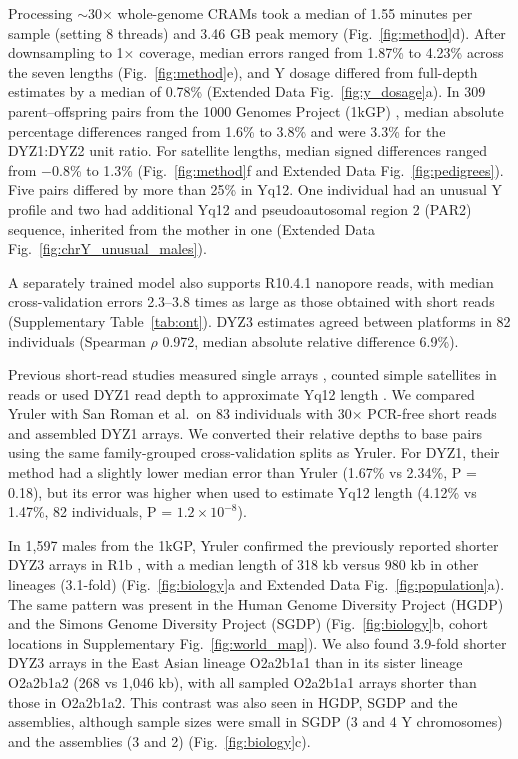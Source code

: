 Processing $\sim$30$\times$ whole-genome CRAMs took a median of 1.55 minutes per sample (setting 8 threads) and 3.46 GB peak memory (Fig.~\ref{fig:method}d). After downsampling to 1$\times$ coverage, median errors ranged from 1.87\% to 4.23\% across the seven lengths (Fig.~\ref{fig:method}e), and Y dosage differed from full-depth estimates by a median of 0.78\% (Extended Data Fig.~\ref{fig:y_dosage}a). In 309 parent--offspring pairs from the 1000 Genomes Project (1kGP) \cite{ByrskaBishop2022}, median absolute percentage differences ranged from 1.6\% to 3.8\% and were 3.3\% for the DYZ1:DYZ2 unit ratio. For satellite lengths, median signed differences ranged from $-$0.8\% to 1.3\% (Fig.~\ref{fig:method}f and Extended Data Fig.~\ref{fig:pedigrees}). Five pairs differed by more than 25\% in Yq12. One individual had an unusual Y profile and two had additional Yq12 and pseudoautosomal region 2 (PAR2) sequence, inherited from the mother in one (Extended Data Fig.~\ref{fig:chrY_unusual_males}).

A separately trained model also supports R10.4.1 nanopore reads, with median cross-validation errors 2.3--3.8 times as large as those obtained with short reads (Supplementary Table~\ref{tab:ont}). DYZ3 estimates agreed between platforms in 82 individuals (Spearman $\rho$ 0.972, median absolute relative difference 6.9\%).

Previous short-read studies measured single arrays \cite{Miga2014,Altemose2014}, counted simple satellites in reads \cite{Said2024} or used DYZ1 read depth to approximate Yq12 length \cite{SanRoman2024}. We compared Yruler with San Roman et al.\ on 83 individuals with 30$\times$ PCR-free short reads and assembled DYZ1 arrays. We converted their relative depths to base pairs using the same family-grouped cross-validation splits as Yruler. For DYZ1, their method had a slightly lower median error than Yruler (1.67\% vs 2.34\%, P = 0.18), but its error was higher when used to estimate Yq12 length (4.12\% vs 1.47\%, 82 individuals, P = $1.2\times10^{-8}$).

In 1,597 males from the 1kGP, Yruler confirmed the previously reported shorter DYZ3 arrays in R1b \cite{Hallast2023}, with a median length of 318 kb versus 980 kb in other lineages (3.1-fold) (Fig.~\ref{fig:biology}a and Extended Data Fig.~\ref{fig:population}a). The same pattern was present in the Human Genome Diversity Project (HGDP) \cite{Bergstrom2020} and the Simons Genome Diversity Project (SGDP) \cite{Mallick2016} (Fig.~\ref{fig:biology}b, cohort locations in Supplementary Fig.~\ref{fig:world_map}). We also found 3.9-fold shorter DYZ3 arrays in the East Asian lineage O2a2b1a1 than in its sister lineage O2a2b1a2 (268 vs 1,046 kb), with all sampled O2a2b1a1 arrays shorter than those in O2a2b1a2. This contrast was also seen in HGDP, SGDP and the assemblies, although sample sizes were small in SGDP (3 and 4 Y chromosomes) and the assemblies (3 and 2) \cite{Hallast2026} (Fig.~\ref{fig:biology}c).

